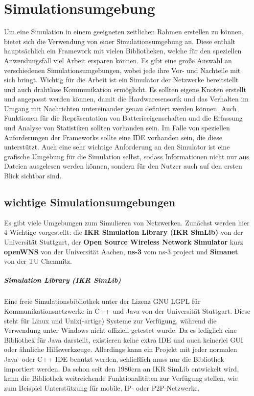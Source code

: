 \chapter{Simulationsumgebung}

Um eine Simulation in einem geeigneten zeitlichen Rahmen erstellen zu können, bietet sich die Verwendung von einer Simulationsumgebung an. Diese enthält hauptsächlich ein Framework mit vielen Bibliotheken, welche für den speziellen Anwendungsfall viel Arbeit ersparen können. \newline
Es gibt eine große Auswahl an verschiedenen Simulationsumgebungen, wobei jede ihre Vor- und Nachteile mit sich bringt. Wichtig für die Arbeit ist ein Simulator der Netzwerke bereitstellt und auch drahtlose Kommunikation ermöglicht. Es sollten eigene Knoten erstellt und angepasst werden können, damit die Hardwaresensorik und das Verhalten im Umgang mit Nachrichten untereinander genau definiert werden können. Auch Funktionen für die Repräsentation von Batterieeigenschaften und die Erfassung und Analyse von Statistiken sollten vorhanden sein.\newline
Im Falle von speziellen Anforderungen der Frameworks sollte eine IDE vorhanden sein, die diese unterstützt. Auch eine sehr wichtige Anforderung an den Simulator ist eine grafische Umgebung für die Simulation selbst, sodass Informationen nicht nur aus Dateien ausgelesen werden können, sondern für den Nutzer auch auf den ersten Blick sichtbar sind.

\section{wichtige Simulationsumgebungen}

Es gibt viele Umgebungen zum Simulieren von Netzwerken. Zunächst werden hier 4 Wichtige vorgestellt: die \textbf{IKR Simulation Library (IKR SimLib)} von der Universität Stuttgart, der \textbf{Open Source Wireless Network Simulator} kurz \textbf{openWNS} von der Universität Aachen, \textbf{ns-3} vom ns-3 project und \textbf{Simanet} von der TU Chemnitz.

\paragraph{Simulation Library (IKR SimLib)\cite{ikr}}

Eine freie Simulationsbibliothek unter der Lizenz GNU LGPL für Kommunikationsnetzwerke in C++ und Java von der Universität Stuttgart. Diese steht für Linux und Unix(-artige) Systeme zur Verfügung, während die Verwendung unter Windows nicht offiziell getestet wurde.\newline
Da es lediglich eine Bibliothek für Java darstellt, existieren keine extra IDE und auch keinerlei GUI oder ähnliche Hilfswerkzeuge. Allerdings kann ein Projekt mit jeder normalen Java- oder C++ IDE benutzt werden, schließlich muss nur die Bibliothek importiert werden.\newline
Da schon seit den 1980ern an IKR SimLib entwickelt wird, kann die Bibliothek weitreichende Funktionalitäten zur Verfügung stellen, wie zum Beispiel Unterstützung für mobile, IP- oder P2P-Netzwerke.


